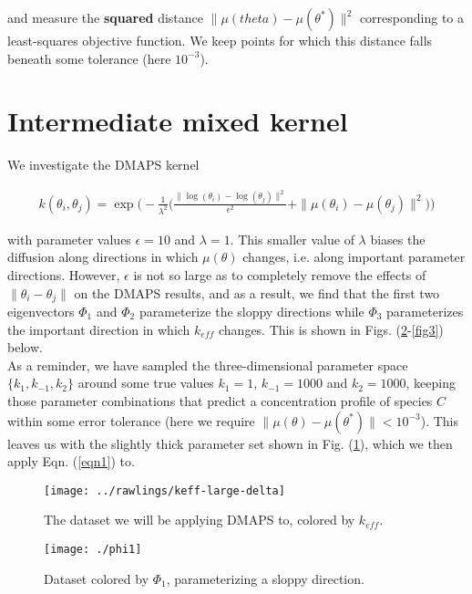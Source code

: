 \documentclass[11pt]{article}
\begin{document}
and measure the \textbf{squared} distance $\| \mu(theta) -
\mu(\theta^*) \|^2$ corresponding to a least-squares objective
function. We keep points for which this distance falls beneath some
tolerance (here $10^{-3}$).

\section{Intermediate mixed kernel}

We investigate the DMAPS kernel

\begin{align}
  k(\theta_i, \theta_j) = \exp \bigg( -\frac{1}{\lambda^2} \bigg( \frac{\|\log(\theta_i)
  - \log(\theta_j)\|^2}{\epsilon^2} + \|\mu(\theta_i) -
  \mu(\theta_j)\|^2\bigg) \bigg)
  \label{eqn1}
\end{align}

with parameter values $\epsilon = 10$ and $\lambda = 1$. This smaller
value of $\lambda$ biases the diffusion along directions in which
$\mu(\theta)$ changes, i.e. along important parameter
directions. However, $\epsilon$ is not so large as to completely
remove the effects of $\| \theta_i - \theta_j \|$ on the DMAPS
results, and as a result, we find that the first two eigenvectors
$\Phi_1$ and $\Phi_2$ parameterize the sloppy directions while
$\Phi_3$ parameterizes the important direction in which $k_{eff}$
changes. This is shown in Figs. (\ref{fig1}-\ref{fig3}) below. \\

As a reminder, we have sampled the three-dimensional parameter space
$\{k_1, k_{-1}, k_2 \}$ around some true values $k_1 = 1$,
$k_{-1} = 1000$ and $k_2 = 1000$, keeping those parameter combinations that
predict a concentration profile of species $C$ within some error
tolerance (here we require $\| \mu(\theta) - \mu(\theta^*) \| <
10^{-3}$). This leaves us with the slightly thick parameter set shown
in Fig. (\ref{fig0}), which we then apply Eqn. (\ref{eqn1}) to.

\begin{figure}[htbp]
  \centering
  \texttt{[image: ../rawlings/keff-large-delta]}
  \caption{The dataset we will be applying DMAPS to, colored by
    $k_{eff}$. \label{fig0}}
\end{figure}

\begin{figure}[htbp]
  \centering
  \texttt{[image: ./phi1]}
  \caption{Dataset colored by $\Phi_1$, parameterizing a sloppy
    direction. \label{fig1}}
\end{figure}
\end{document}
